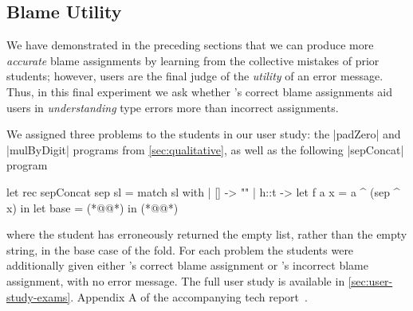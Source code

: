 \subsection{Blame Utility}
\label{sec:user-study}



We have demonstrated in the preceding sections that we can produce
more \emph{accurate} blame assignments by learning from the collective
mistakes of prior students; however, users are the final judge of
the \emph{utility} of an error message.
%
Thus, in this final experiment we ask whether \toolname's correct blame
assignments aid users in \emph{understanding} type errors
more than incorrect assignments.

We assigned three problems to the students in our user study: the
|padZero| and |mulByDigit| programs from \autoref{sec:qualitative}, as
well as the following |sepConcat| program
%
\begin{ecode}
  let rec sepConcat sep sl =
    match sl with
    | [] -> ""
    | h::t ->
        let f a x = a ^ (sep ^ x) in
        let base = (*@\hlTree{[]}@*) in
        (*@@*)
\end{ecode}
%
where the student has erroneously returned the empty list, rather than
the empty string, in the base case of the fold.
%
For each problem the students were additionally given either \toolname's
correct blame assignment or \sherrloc's incorrect blame assignment,
with no error message.
%
The full user study is available in
{\autoref{sec:user-study-exams}.}
{Appendix A of the accompanying tech report~\cite{Seidel2017Learning-TechRep}.}

